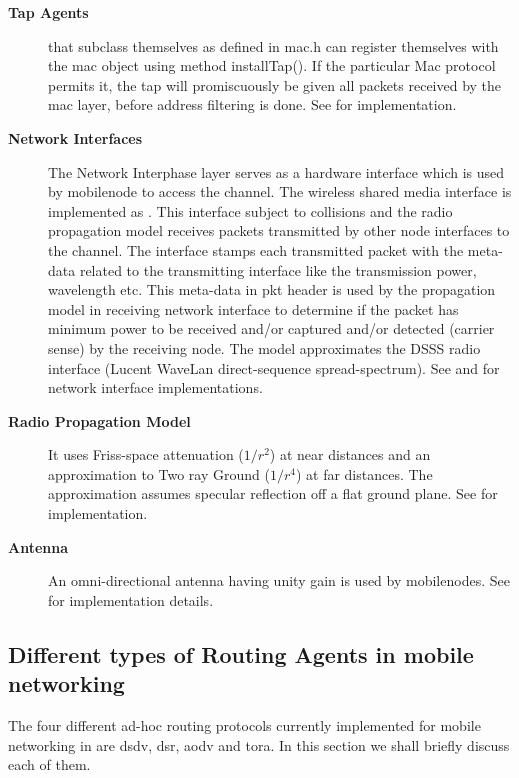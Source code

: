 \begin{description}
\item[{\bf Tap Agents}]  that subclass themselves as
   defined in mac.h can register themselves
  with the mac object using method installTap(). If the particular Mac
  protocol permits it, the tap will promiscuously be 
  given all packets received by the mac layer, before address filtering
  is done. See  for  implementation. 

\item[{\bf Network Interfaces}] The Network Interphase layer serves as
  a hardware interface which is used by mobilenode to access the
  channel. The wireless shared media interface is implemented as
  . This interface
  subject to collisions and the radio propagation model receives
  packets transmitted by other node interfaces to the channel. The
  interface stamps each transmitted packet with the meta-data related
  to the transmitting interface like the transmission power,
  wavelength etc. This meta-data in pkt header is used by the
  propagation model in receiving network interface to determine if the
  packet has minimum power to be received and/or captured and/or
  detected (carrier sense) by the receiving node. The model
  approximates the DSSS radio interface (Lucent WaveLan
  direct-sequence spread-spectrum). See  and
   for network interface implementations.

\item[{\bf Radio Propagation Model}]  It uses Friss-space attenuation
  ($1/r^2$) at near distances and an approximation to Two ray Ground
  ($1/r^4$) at far distances. The approximation assumes specular
  reflection off a flat ground plane. See 
  for implementation.

\item[{\bf Antenna}] An omni-directional antenna having unity gain is 
  used by mobilenodes. See  for implementation
  details. 
\end{description}

\subsection{Different types of Routing Agents in mobile networking}
\label{sec:mobilenode-routing}

The four different ad-hoc routing protocols currently implemented
for mobile networking in \ns are dsdv, dsr, aodv and tora. In this section
we shall briefly discuss each of them.

